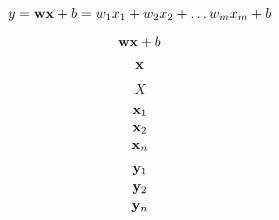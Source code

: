 \documentclass[11pt]{article}
\begin{document}
\[
y = {\bf w} {\bf x} + b = w_1 x_1 + w_2 x_2 + \ldots w_m x_m + b 
\]

\[
{\bf w} {\bf x} + b
\]

\[
{\bf x}
\]

\[
X
\]

\[
{\bf x}_1
\]
\[
{\bf x}_2
\]
\[
{\bf x}_n
\]

\[
{\bf y}_1
\]
\[
{\bf y}_2
\]
\[
{\bf y}_n
\]


 
\end{document}
